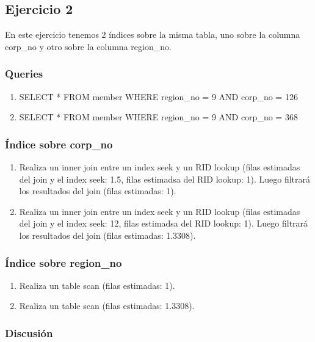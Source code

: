 
\subsection{Ejercicio 2}

En este ejercicio tenemos 2 índices sobre la misma tabla, uno sobre la columna corp\_no y otro sobre la columna region\_no.

\subsubsection{Queries}

\begin{enumerate}[label=(\alph*)]
\item SELECT * FROM member WHERE region\_no = 9 AND corp\_no = 126
\item SELECT * FROM member WHERE region\_no = 9 AND corp\_no = 368
\end{enumerate}

\subsubsection{Índice sobre corp\_no}
\begin{enumerate}[label=(\alph*)]
  \item Realiza un inner join entre un index seek y un RID lookup (filas estimadas del join y el index seek: 1.5, filas estimadsa del RID lookup: 1). Luego filtrará los resultados del join (filas estimadas: 1).
  \item Realiza un inner join entre un index seek y un RID lookup (filas estimadas del join y el index seek: 12, filas estimadsa del RID lookup: 1). Luego filtrará los resultados del join (filas estimadas: 1.3308).
\end{enumerate}

\subsubsection{Índice sobre region\_no}
\begin{enumerate}[label=(\alph*)]
  \item Realiza un table scan (filas estimadas: 1).
  \item Realiza un table scan (filas estimadas: 1.3308).
\end{enumerate}

\subsubsection{Discusión}
